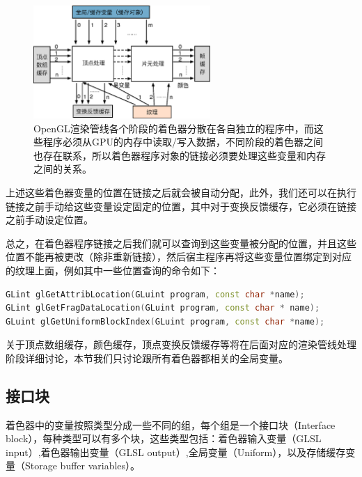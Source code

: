 \begin{figure}
\sidecaption
	\includegraphics[width=0.6\textwidth]{figures/api/locations}
	\caption{OpenGL渲染管线各个阶段的着色器分散在各自独立的程序中，而这些程序必须从GPU的内存中读取/写入数据，不同阶段的着色器之间也存在联系，所以着色器程序对象的链接必须要处理这些变量和内存之间的关系。}
	\label{f:api-locations}
\end{figure}

上述这些着色器变量的位置在链接之后就会被自动分配，此外，我们还可以在执行链接之前手动给这些变量设定固定的位置，其中对于变换反馈缓存，它必须在链接之前手动设定位置。

总之，在着色器程序链接之后我们就可以查询到这些变量被分配的位置，并且这些位置不能再被更改（除非重新链接），然后宿主程序再将这些变量位置绑定到对应的纹理上面，例如其中一些位置查询的命令如下：

\begin{lstlisting}[language=C++]
GLint glGetAttribLocation​(GLuint program​, const char *name​);
GLint glGetFragDataLocation​(GLuint program​, const char * name​);
GLuint glGetUniformBlockIndex​(GLuint program​​, const char *name​​);
\end{lstlisting}


关于顶点数组缓存，颜色缓存，顶点变换反馈缓存等将在后面对应的渲染管线处理阶段详细讨论，本节我们只讨论跟所有着色器都相关的全局变量。





\subsection{接口块}\label{sec:api-interface-block}
着色器中的变量按照类型分成一些不同的组，每个组是一个接口块（Interface block），每种类型可以有多个块，这些类型包括：着色器输入变量（GLSL input）,着色器输出变量（GLSL output）,全局变量（Uniform），以及存储缓存变量（Storage buffer variables）。

